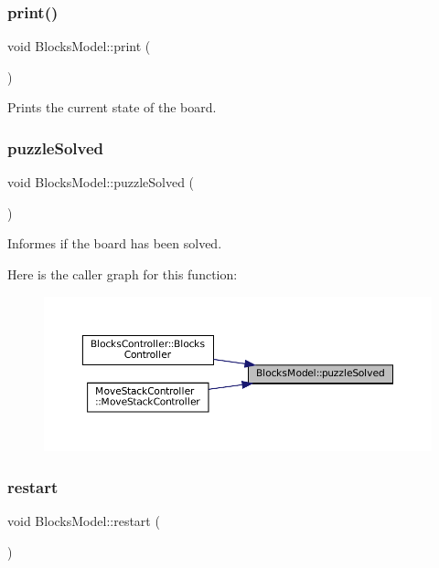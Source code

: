 \subsubsection{\texorpdfstring{print()}{print()}}
{\footnotesize\ttfamily void Blocks\+Model\+::print (\begin{DoxyParamCaption}{ }\end{DoxyParamCaption})}



Prints the current state of the board. 

\mbox{\label{class_blocks_model_a0511c008064fa694adfc249c096609bb}} 
\subsubsection{\texorpdfstring{puzzleSolved}{puzzleSolved}}
{\footnotesize\ttfamily void Blocks\+Model\+::puzzle\+Solved (\begin{DoxyParamCaption}{ }\end{DoxyParamCaption})\hspace{0.3cm}{\ttfamily [signal]}}



Informes if the board has been solved. 

Here is the caller graph for this function\+:
\nopagebreak
\begin{figure}[H]
\begin{center}
\leavevmode
\includegraphics[width=350pt]{class_blocks_model_a0511c008064fa694adfc249c096609bb_icgraph}
\end{center}
\end{figure}
\mbox{\label{class_blocks_model_a73cc9633752440b2060b5bb1f964d9e6}} 
\subsubsection{\texorpdfstring{restart}{restart}}
{\footnotesize\ttfamily void Blocks\+Model\+::restart (\begin{DoxyParamCaption}{ }\end{DoxyParamCaption})\hspace{0.3cm}{\ttfamily [slot]}}



